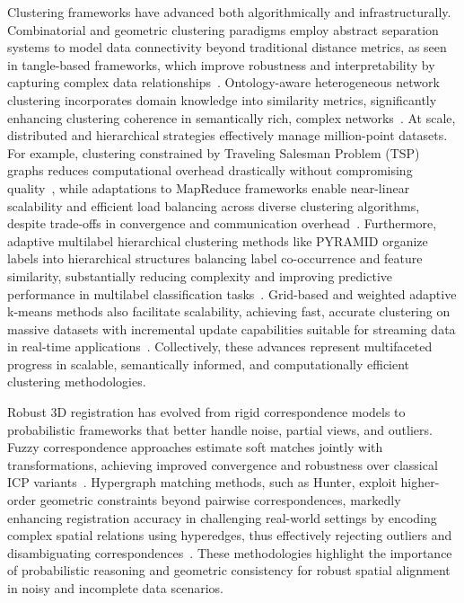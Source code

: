 \documentclass[sigconf]{acmart}
\begin{document}
Clustering frameworks have advanced both algorithmically and infrastructurally. Combinatorial and geometric clustering paradigms employ abstract separation systems to model data connectivity beyond traditional distance metrics, as seen in tangle-based frameworks, which improve robustness and interpretability by capturing complex data relationships~\cite{ref16}. Ontology-aware heterogeneous network clustering incorporates domain knowledge into similarity metrics, significantly enhancing clustering coherence in semantically rich, complex networks~\cite{ref17}. At scale, distributed and hierarchical strategies effectively manage million-point datasets. For example, clustering constrained by Traveling Salesman Problem (TSP) graphs reduces computational overhead drastically without compromising quality~\cite{ref19}, while adaptations to MapReduce frameworks enable near-linear scalability and efficient load balancing across diverse clustering algorithms, despite trade-offs in convergence and communication overhead~\cite{ref16}. Furthermore, adaptive multilabel hierarchical clustering methods like PYRAMID organize labels into hierarchical structures balancing label co-occurrence and feature similarity, substantially reducing complexity and improving predictive performance in multilabel classification tasks~\cite{ref17}. Grid-based and weighted adaptive k-means methods also facilitate scalability, achieving fast, accurate clustering on massive datasets with incremental update capabilities suitable for streaming data in real-time applications~\cite{ref20}. Collectively, these advances represent multifaceted progress in scalable, semantically informed, and computationally efficient clustering methodologies.

Robust 3D registration has evolved from rigid correspondence models to probabilistic frameworks that better handle noise, partial views, and outliers. Fuzzy correspondence approaches estimate soft matches jointly with transformations, achieving improved convergence and robustness over classical ICP variants~\cite{ref6}. Hypergraph matching methods, such as Hunter, exploit higher-order geometric constraints beyond pairwise correspondences, markedly enhancing registration accuracy in challenging real-world settings by encoding complex spatial relations using hyperedges, thus effectively rejecting outliers and disambiguating correspondences~\cite{ref7}. These methodologies highlight the importance of probabilistic reasoning and geometric consistency for robust spatial alignment in noisy and incomplete data scenarios.
\end{document}
